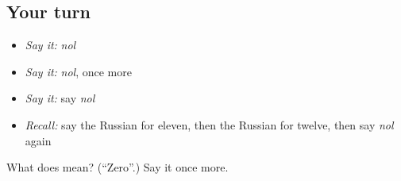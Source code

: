 \subsection*{Your turn}
\begin{itemize}
\raggedright
  \item \emph{Say it:} \emph{nol}
  \item \emph{Say it:} \emph{nol}, once more
  \item \emph{Say it:} say \emph{nol}
  \item \emph{Recall:} say the Russian for eleven, then the Russian for twelve, then say \emph{nol} again
\end{itemize}

\begin{tcolorbox}[breakable,colback=teal!4,colframe=teal!35!black,title={Before you move on}]
What does  mean? (\textquotedblleft{}Zero\textquotedblright{}.) Say it once more.
\end{tcolorbox}
